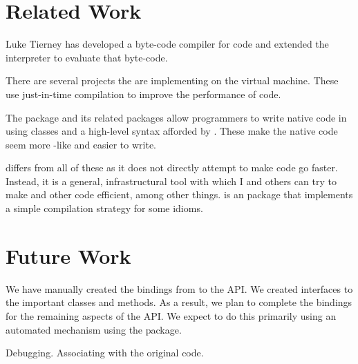 \documentclass[article]{jss}
\def\RClang{\Rpkg{RCIndex}}
\def\Rllvm{\Rpkg{Rllvm}}
\begin{document}
\section{Related Work}
Luke Tierney has developed a byte-code compiler for \R{} code
and extended the \R{} interpreter to evaluate that byte-code.

There are several projects the are implementing \R{} on the \Java{}
virtual machine.  These use just-in-time compilation to improve the
performance of code.

The  package and its related packages allow \R{}
programmers to write native code in \Cpp{} using classes and a
high-level syntax afforded by \Cpp{}.  These make the native code seem
more \R{}-like and easier to write.

\Rllvm{} differs from all of these as it does not directly attempt to
make \R{} code go faster. Instead, it is a general, infrastructural
tool with which I and others can try to make \R{} and other code
efficient, among other things.  is an \R{} package
that implements a simple compilation strategy for some \R{} idioms.

\section{Future Work}

We have manually created the bindings from \R{} to the \llvm{} API. We
created interfaces to the important classes and methods. As a result,
we plan to complete the bindings for the remaining aspects of the API.
We expect to do this primarily using an automated mechanism using the
\RClang{} package.

Debugging.
Associating with the original code.



\end{document}
